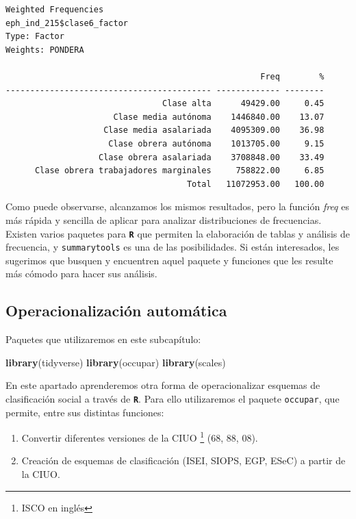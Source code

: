 \documentclass[
]{article}
\newenvironment{Shaded}{\begin{snugshade}}{\end{snugshade}}
\newcommand{\FunctionTok}[1]{\textcolor[rgb]{0.13,0.29,0.53}{\textbf{#1}}}
\newcommand{\NormalTok}[1]{#1}
\begin{document}
\begin{verbatim}
Weighted Frequencies  
eph_ind_215$clase6_factor  
Type: Factor  
Weights: PONDERA  

                                                    Freq        %
------------------------------------------ ------------- --------
                                Clase alta      49429.00     0.45
                      Clase media autónoma    1446840.00    13.07
                    Clase media asalariada    4095309.00    36.98
                     Clase obrera autónoma    1013705.00     9.15
                   Clase obrera asalariada    3708848.00    33.49
      Clase obrera trabajadores marginales     758822.00     6.85
                                     Total   11072953.00   100.00
\end{verbatim}

Como puede observarse, alcanzamos los mismos resultados, pero la función \emph{freq} es más rápida y sencilla de aplicar para analizar distribuciones de frecuencias. Existen varios paquetes para \textbf{\texttt{R}} que permiten la elaboración de tablas y análisis de frecuencia, y \texttt{summarytools} es una de las posibilidades. Si están interesados, les sugerimos que busquen y encuentren aquel paquete y funciones que les resulte más cómodo para hacer sus análisis.

\hypertarget{operacion2}{%
\subsection{Operacionalización automática}\label{operacion2}}

Paquetes que utilizaremos en este subcapítulo:

\begin{Shaded}
\begin{Highlighting}[]
\FunctionTok{library}\NormalTok{(tidyverse)}
\FunctionTok{library}\NormalTok{(occupar)}
\FunctionTok{library}\NormalTok{(scales)}
\end{Highlighting}
\end{Shaded}

En este apartado aprenderemos otra forma de operacionalizar esquemas de clasificación social a través de \textbf{\texttt{R}}. Para ello utilizaremos el paquete \texttt{occupar}, que permite, entre sus distintas funciones:

\begin{enumerate}
\def\labelenumi{\arabic{enumi}.}
\item
  Convertir diferentes versiones de la CIUO \footnote{ISCO en inglés} (68, 88, 08).
\item
  Creación de esquemas de clasificación (ISEI, SIOPS, EGP, ESeC) a partir de la CIUO.
\end{enumerate}
\end{document}
